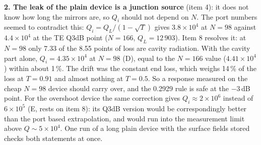 \documentclass[11pt,a4paper]{article}
\begin{document}
\textbf{2. The leak of the plain device is a junction source} (item 4): it does not know how long the mirrors
are, so $Q_i$ should not depend on $N$. The port numbers seemed to contradict this: $Q_i=Q_L/(1-\sqrt T)$ gives
$3.8\times10^4$ at $N=98$ against $4.4\times10^4$ at the TE Q3dB point ($N=166$, $Q_L=12\,903$). Item 8 resolves
it: at $N=98$ only 7.33 of the 8.55 points of loss are cavity radiation. With the cavity part alone,
$Q_i=4.35\times10^4$ at $N=98$ (D), equal to the $N=166$ value ($4.41\times10^4$) within about 1\,\%. The drift was the constant end
loss, which weighs 14\,\% of the loss at $T=0.91$ and almost nothing at $T=0.5$. So a response measured on the
cheap $N=98$ device should carry over, and the 0.2929 rule is safe at the $-3$\,dB point. For the overshoot
device the same correction gives $Q_i\approx2\times10^6$ instead of $6\times10^5$ (E, rests on item 8): its
Q3dB version would be correspondingly better than the port based extrapolation, and would run into the
measurement limit above $Q\sim5\times10^4$. One run of a long plain device with the surface fields stored
checks both statements at once.
\end{document}
